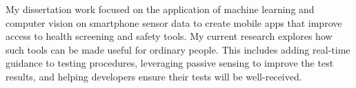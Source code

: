 \justify
My dissertation work focused on the application of machine learning and computer vision on smartphone sensor data to create mobile apps that improve access to health screening and safety tools. My current research explores how such tools can be made useful for ordinary people. This includes adding real-time guidance to testing procedures, leveraging passive sensing to improve the test results, and helping developers ensure their tests will be well-received.